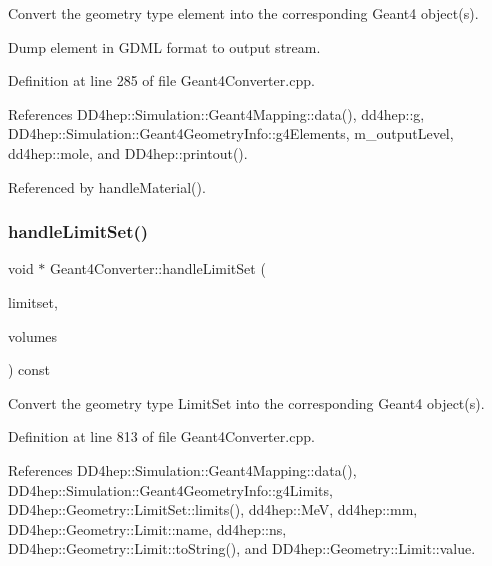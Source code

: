Convert the geometry type element into the corresponding Geant4 object(s). 

Dump element in G\+D\+ML format to output stream. 

Definition at line 285 of file Geant4\+Converter.\+cpp.



References D\+D4hep\+::\+Simulation\+::\+Geant4\+Mapping\+::data(), dd4hep\+::g, D\+D4hep\+::\+Simulation\+::\+Geant4\+Geometry\+Info\+::g4\+Elements, m\+\_\+output\+Level, dd4hep\+::mole, and D\+D4hep\+::printout().



Referenced by handle\+Material().

\hypertarget{class_d_d4hep_1_1_simulation_1_1_geant4_converter_a2b6f64baaf6ad47025394cc3cb98cad9}{}\label{class_d_d4hep_1_1_simulation_1_1_geant4_converter_a2b6f64baaf6ad47025394cc3cb98cad9} 
\subsubsection{\texorpdfstring{handle\+Limit\+Set()}{handleLimitSet()}}
{\footnotesize\ttfamily void $\ast$ Geant4\+Converter\+::handle\+Limit\+Set (\begin{DoxyParamCaption}\item[{\hyperlink{class_d_d4hep_1_1_simulation_1_1_geant4_mapping_a274f93e912e70a162849adb21f54184e}{Limit\+Set}}]{limitset,  }\item[{const std\+::set$<$ const T\+Geo\+Volume $\ast$$>$ \&}]{volumes }\end{DoxyParamCaption}) const\hspace{0.3cm}{\ttfamily [virtual]}}



Convert the geometry type Limit\+Set into the corresponding Geant4 object(s). 



Definition at line 813 of file Geant4\+Converter.\+cpp.



References D\+D4hep\+::\+Simulation\+::\+Geant4\+Mapping\+::data(), D\+D4hep\+::\+Simulation\+::\+Geant4\+Geometry\+Info\+::g4\+Limits, D\+D4hep\+::\+Geometry\+::\+Limit\+Set\+::limits(), dd4hep\+::\+MeV, dd4hep\+::mm, D\+D4hep\+::\+Geometry\+::\+Limit\+::name, dd4hep\+::ns, D\+D4hep\+::\+Geometry\+::\+Limit\+::to\+String(), and D\+D4hep\+::\+Geometry\+::\+Limit\+::value.



